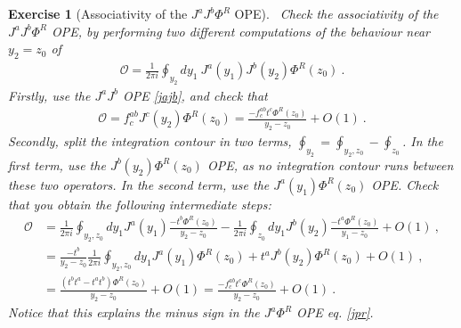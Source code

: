 \documentclass[12pt, a4paper, notitlepage, twoside]{report}
\numberwithin{equation}{section}
\theoremstyle{break}
\newtheorem{exo}{Exercise}[chapter]
\begin{document}
\begin{exo}[Associativity of the $J^aJ^b\Phi^R$ OPE]
 ~\label{exojjp}
Check the associativity of the $J^aJ^b\Phi^R$ OPE, by performing two different computations of the behaviour near $y_2=z_0$ of 
\begin{align}
\mathcal{O}= \frac{1}{2\pi i} \oint_{y_2}dy_1\ J^a(y_1)J^b(y_2)\Phi^R(z_0)\ .
\end{align}
Firstly, use the $J^aJ^b$ OPE \eqref{jajb}, and check that
\begin{align}
 \mathcal{O}= f_c^{ab}J^c(y_2)\Phi^R(z_0) = \frac{-f_c^{ab}t^c\Phi^R(z_0)}{y_2-z_0} + O(1)\ .
\end{align}
Secondly, split the integration contour in two terms, $\oint_{y_2} = \oint_{y_2,z_0} - \oint_{z_0}$.
In the first term, use the $J^b(y_2)\Phi^R(z_0)$ OPE, as no integration contour runs between these two operators.
In the second term, use the $J^a(y_1)\Phi^R(z_0)$ OPE.
Check that you obtain the following intermediate steps:
\begin{align}
 \mathcal{O}& =\frac{1}{2\pi i} \oint_{y_2,z_0}dy_1 J^a(y_1)\frac{-t^b\Phi^R(z_0)}{y_2-z_0} - \frac{1}{2\pi i} \oint_{z_0}dy_1 J^b(y_2)\frac{-t^a\Phi^R(z_0)}{y_1-z_0} +O(1)\ ,
\\
& = \frac{-t^b}{y_2-z_0} \frac{1}{2\pi i} \oint_{y_2,z_0}dy_1 J^a(y_1)\Phi^R(z_0) + t^a J^b(y_2)\Phi^R(z_0) + O(1)\ ,
\\
& = \frac{(t^bt^a-t^at^b)\Phi^R(z_0)}{y_2-z_0} + O(1) =  \frac{-f_c^{ab}t^c\Phi^R(z_0)}{y_2-z_0} + O(1)\ .
\end{align}
Notice that this explains the minus sign in the $J^a\Phi^R$ OPE eq. \eqref{jpr}.
\end{exo}
\end{document}
